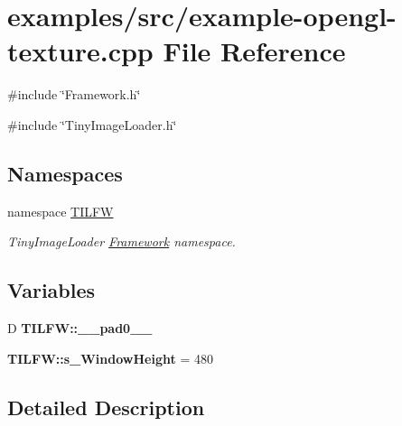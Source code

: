 \hypertarget{example-opengl-texture_8cpp}{
\section{examples/src/example-\/opengl-\/texture.cpp File Reference}
\label{example-opengl-texture_8cpp}
}
{\ttfamily \#include \char`\"{}Framework.h\char`\"{}}\par
{\ttfamily \#include \char`\"{}TinyImageLoader.h\char`\"{}}\par
\subsection*{Namespaces}
\begin{DoxyCompactItemize}
\item 
namespace \hyperlink{namespace_t_i_l_f_w}{TILFW}


\begin{DoxyCompactList}\small\item\em TinyImageLoader \hyperlink{class_t_i_l_f_w_1_1_framework}{Framework} namespace. \item\end{DoxyCompactList}

\end{DoxyCompactItemize}
\subsection*{Variables}
\begin{DoxyCompactItemize}
\item 
\hypertarget{namespace_t_i_l_f_w_a5a6b9c19ed6a42d133f77a0897579243}{
D {\bfseries TILFW::\_\-\_\-pad0\_\-\_\-}}
\label{namespace_t_i_l_f_w_a5a6b9c19ed6a42d133f77a0897579243}

\item 
\hypertarget{namespace_t_i_l_f_w_a74d9924a1a473f0ff11e69da582501ec}{
{\bfseries TILFW::s\_\-WindowHeight} = 480}
\label{namespace_t_i_l_f_w_a74d9924a1a473f0ff11e69da582501ec}

\end{DoxyCompactItemize}


\subsection{Detailed Description}
